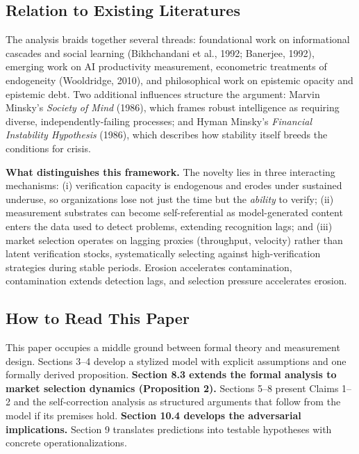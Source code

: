 \documentclass[11pt,a4paper]{article}
\begin{document}
\hypertarget{relation-to-existing-literatures}{%
\subsection{ Relation to Existing Literatures}\label{relation-to-existing-literatures}}

The analysis braids together several threads: foundational work on informational cascades and social learning (Bikhchandani et al., 1992; Banerjee, 1992), emerging work on AI productivity measurement, econometric treatments of endogeneity (Wooldridge, 2010), and philosophical work on epistemic opacity and epistemic debt. Two additional influences structure the argument: Marvin Minsky's \emph{Society of Mind} (1986), which frames robust intelligence as requiring diverse, independently-failing processes; and Hyman Minsky's \emph{Financial Instability Hypothesis} (1986), which describes how stability itself breeds the conditions for crisis.

\textbf{What distinguishes this framework.} The novelty lies in three interacting mechanisms: (i) verification capacity is endogenous and erodes under sustained underuse, so organizations lose not just the time but the \emph{ability} to verify; (ii) measurement substrates can become self-referential as model-generated content enters the data used to detect problems, extending recognition lags; and (iii) market selection operates on lagging proxies (throughput, velocity) rather than latent verification stocks, systematically selecting against high-verification strategies during stable periods. Erosion accelerates contamination, contamination extends detection lags, and selection pressure accelerates erosion.

\hypertarget{how-to-read-this-paper}{%
\subsection{ How to Read This Paper}\label{how-to-read-this-paper}}

This paper occupies a middle ground between formal theory and measurement design. Sections 3--4 develop a stylized model with explicit assumptions and one formally derived proposition. \textbf{Section 8.3 extends the formal analysis to market selection dynamics (Proposition 2).} Sections 5--8 present Claims 1--2 and the self-correction analysis as structured arguments that follow from the model if its premises hold. \textbf{Section 10.4 develops the adversarial implications.} Section 9 translates predictions into testable hypotheses with concrete operationalizations.
\end{document}
